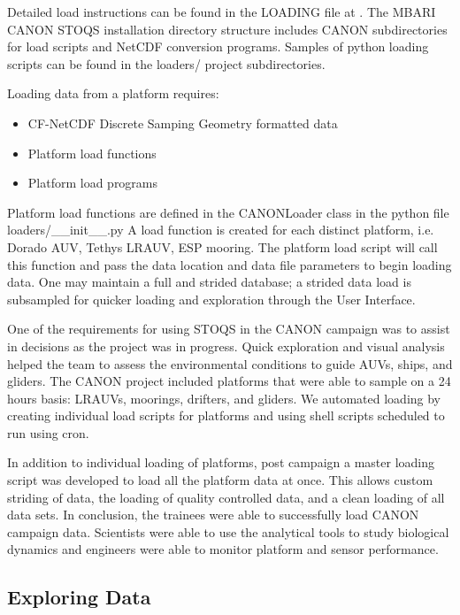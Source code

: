 \documentclass[conference]{IEEEtran}
\begin{document}
Detailed load instructions can be found in the LOADING file at \cite{STOQS}. The MBARI CANON STOQS installation directory structure includes CANON subdirectories for load scripts and NetCDF conversion programs. Samples of python loading scripts can be found in the loaders/ project subdirectories. 

Loading data from a platform requires:

\begin{itemize}
\item CF-NetCDF Discrete Samping Geometry formatted data
\item Platform load functions
\item Platform load programs
\end{itemize}

Platform load functions are defined in the CANONLoader class in the python file loaders/\_\_init\_\_.py   A load function is created for each distinct platform, i.e. Dorado AUV, Tethys LRAUV, ESP mooring. The platform load script will call this function and pass the data location and data file parameters to begin loading data.  One may maintain a full and strided database; a strided data load is subsampled for quicker loading and exploration through the User Interface.

One of the requirements for using STOQS in the CANON campaign was to assist in decisions as the project was in progress. Quick exploration and visual analysis helped the team to assess the environmental conditions to guide AUVs, ships, and gliders.  The CANON project included platforms that were able to sample on a 24 hours basis: LRAUVs, moorings, drifters, and gliders. We automated loading by creating individual load scripts for platforms and using shell scripts scheduled to run using cron. 

In addition to individual loading of platforms, post campaign a master loading script was developed to load all the platform data at once.  This allows custom striding of data, the loading of quality controlled data, and a clean loading of all data sets.  In conclusion, the trainees were able to successfully load CANON campaign data.  Scientists were able to use the analytical tools to study biological dynamics and engineers were able to monitor platform and sensor performance.  



\subsection{Exploring Data}
\end{document}
